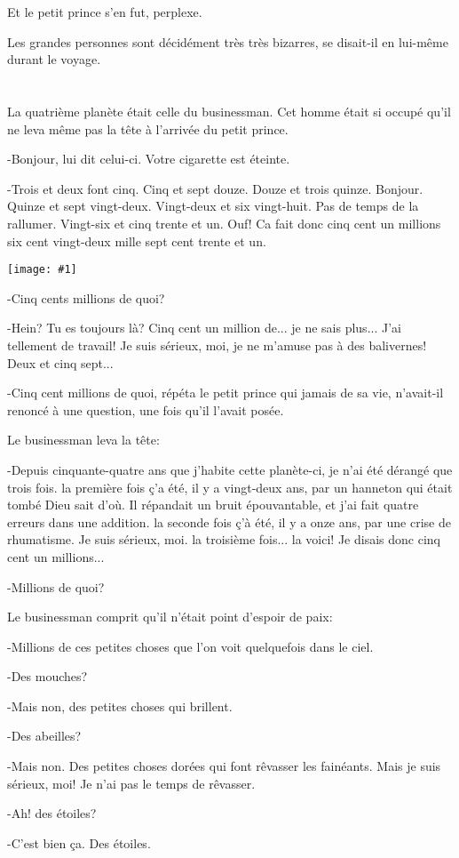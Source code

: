 \documentclass{report}
\newcommand{\parachapter}[2][]{\end{paracol}\chapter[#1]{#2}\begin{paracol}{2}}
\newcommand{\incpic}[1]{%
\end{paracol}
\begin{center}
    \texttt{[image: \#1]}
\end{center}
\begin{paracol}{2}}
\begin{document}
\begin{paracol}{2}
Et le petit prince s'en fut, perplexe.

Les grandes personnes sont décidément très très bizarres, se disait-il en lui-même durant le voyage.
\parachapter{} %
La quatrième planète était celle du businessman. Cet homme était si occupé qu'il ne leva même pas la tête à l'arrivée du petit prince.

-Bonjour, lui dit celui-ci. Votre cigarette est éteinte.

-Trois et deux font cinq. Cinq et sept douze. Douze et trois quinze. Bonjour. Quinze et sept vingt-deux. Vingt-deux et six vingt-huit. Pas de temps de la rallumer. Vingt-six et cinq trente et un. Ouf! Ca fait donc cinq cent un millions six cent vingt-deux mille sept cent trente et un.

\incpic{pic/image28.jpeg}

-Cinq cents millions de quoi?

-Hein? Tu es toujours là? Cinq cent un million de... je ne sais plus... J'ai tellement de travail! Je suis sérieux, moi, je ne m'amuse pas à des balivernes! Deux et cinq sept...

-Cinq cent millions de quoi, répéta le petit prince qui jamais de sa vie, n'avait-il renoncé à une question, une fois qu'il l'avait posée.

Le businessman leva la tête:

-Depuis cinquante-quatre ans que j'habite cette planète-ci, je n'ai été dérangé que trois fois. la première fois ç'a été, il y a vingt-deux ans, par un hanneton qui était tombé Dieu sait d'où. Il répandait un bruit épouvantable, et j'ai fait quatre erreurs dans une addition. la seconde fois ç'à été, il y a onze ans, par une crise de rhumatisme. Je suis sérieux, moi. la troisième fois... la voici! Je disais donc cinq cent un millions...

-Millions de quoi?

Le businessman comprit qu'il n'était point d'espoir de paix:

-Millions de ces petites choses que l'on voit quelquefois dans le ciel.

-Des mouches?

-Mais non, des petites choses qui brillent.

-Des abeilles?

-Mais non. Des petites choses dorées qui font rêvasser les fainéants. Mais je suis sérieux, moi! Je n'ai pas le temps de rêvasser.

-Ah! des étoiles?

-C'est bien ça. Des étoiles.


\end{paracol}
\end{document}
